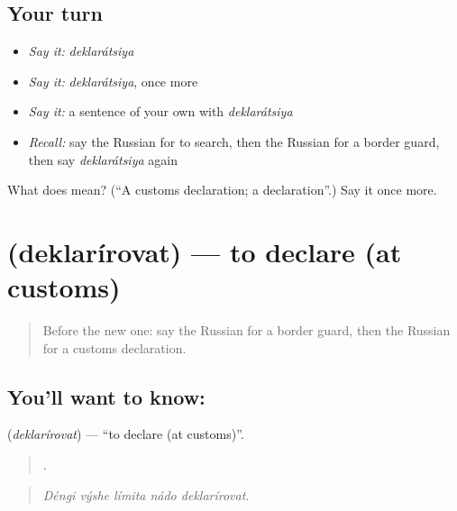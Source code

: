 \subsection*{Your turn}
\begin{itemize}
\raggedright
  \item \emph{Say it:} \emph{deklarátsiya}
  \item \emph{Say it:} \emph{deklarátsiya}, once more
  \item \emph{Say it:} a sentence of your own with \emph{deklarátsiya}
  \item \emph{Recall:} say the Russian for to search, then the Russian for a border guard, then say \emph{deklarátsiya} again
\end{itemize}

\begin{tcolorbox}[breakable,colback=teal!4,colframe=teal!35!black,title={Before you move on}]
What does  mean? (\textquotedblleft{}A customs declaration; a declaration\textquotedblright{}.) Say it once more.
\end{tcolorbox}
\section[\texorpdfstring{\ru{декларировать} (deklarírovat)}{декларировать (deklarírovat)}]{ (deklarírovat) — to declare (at customs)}

\label{lesson:RU-C420-deklarirovat}



\begin{quote}
Before the new one: say the Russian for a border guard, then the Russian for a customs declaration.
\end{quote}

\subsection*{You'll want to know: }
\textbf{} (\emph{deklarírovat}) — \textquotedblleft{}to declare (at customs)\textquotedblright{}.

\begin{quote}
    .
\end{quote}

\begin{quote}
\emph{Déngi výshe límita nádo deklarírovat.}
\end{quote}

